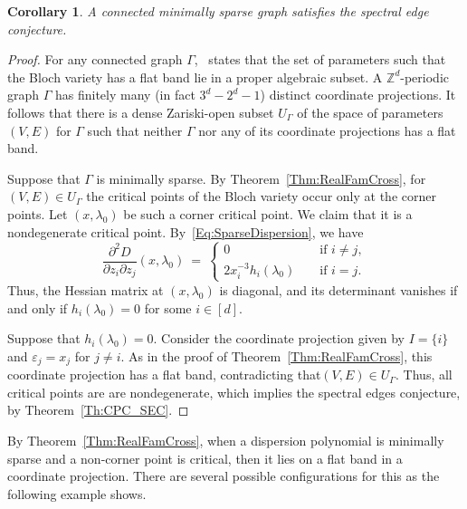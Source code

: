 \documentclass[12pt]{amsart}
\newtheorem{Corollary}[Theorem]{Corollary}
\theoremstyle{remark}
\newcommand{\ZZ}{{\mathbb Z}}
\newcommand{\defcolor}[1]{{\color{blue}#1}}
\begin{document}
\begin{Corollary}\label{Cor:SPEC1}
    A connected minimally sparse graph satisfies the spectral edge conjecture.
\end{Corollary}
\begin{proof}
  For any connected graph $\Gamma$,~\cite[Theorem 1.1]{faust2025rareflatbandsperiodic} states that the set of parameters such
  that the Bloch
  variety has a flat band lie in a proper algebraic subset.
  A $\ZZ^d$-periodic graph $\Gamma$ has finitely many (in fact $3^d-2^d-1$) distinct coordinate projections.
  It follows that there is a dense Zariski-open subset \defcolor{$U_\Gamma$} of the space of parameters $(V,E)$ for $\Gamma$
  such that neither $\Gamma$ nor any of its coordinate projections has a flat band.

  Suppose that $\Gamma$ is minimally sparse.
  By Theorem~\ref{Thm:RealFamCross}, for $(V,E)\in U_\Gamma$ the critical points of the Bloch variety occur only at the
  corner points.
  Let $(x,\lambda_0)$ be such a corner critical point.
  We claim that it is a nondegenerate critical point.
  By~\eqref{Eq:SparseDispersion}, we have
  \[
  \frac{\partial^2 D}{\partial z_i\partial z_j}(x,\lambda_0) \ =\
  \left\{ \begin{array}{rcl} 0&&\mbox{ if } i\neq j,\\  2x_i^{-3} h_i(\lambda_0)&&\mbox{ if } i=j.\end{array}\right. 
  \]
  Thus, the Hessian matrix at $(x,\lambda_0)$ is diagonal, and its determinant vanishes if and only if
  $h_i(\lambda_0)=0$ for some $i\in[d]$.

  Suppose that $h_i(\lambda_0)=0$.
  Consider the coordinate projection given by $I=\{i\}$ and $\varepsilon_j=x_j$ 
  for $j\neq i$.
  As in the proof of Theorem~\ref{Thm:RealFamCross}, this coordinate projection has a flat band,
  contradicting that$(V,E)\in U_\Gamma$.
  Thus, all critical points are are nondegenerate,  which implies the spectral edges conjecture, by Theorem~\ref{Th:CPC_SEC}.
\end{proof}  

By  Theorem~\ref{Thm:RealFamCross}, when a dispersion polynomial is minimally sparse and a non-corner point is critical, then
it lies on a flat band in a
coordinate projection.
There are several possible configurations for this as the following example shows.
\end{document}
